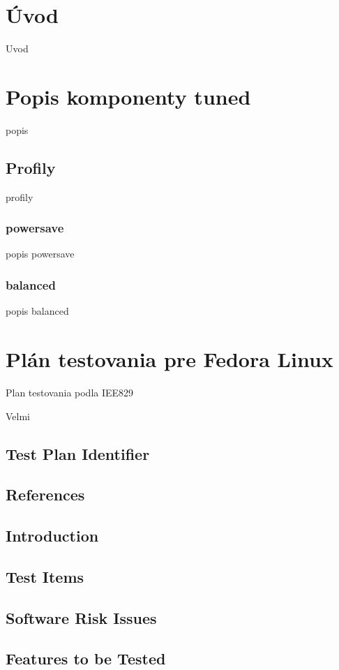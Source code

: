 
\chapter{Úvod}
Uvod

\chapter{Popis komponenty tuned}
popis

\section{Profily}
profily
\subsection{powersave}
popis powersave
\subsection{balanced}
popis balanced

\chapter{Plán testovania pre Fedora Linux}
Plan testovania podla IEE829

Velmi 

\section{Test Plan Identifier}
\section{References}

\section{Introduction}
\section{Test Items}
\section{Software Risk Issues}
\section{Features to be Tested}
